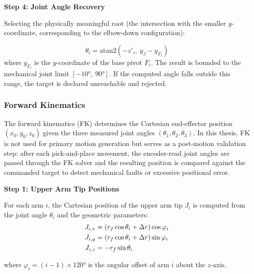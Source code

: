 \par\noindent\textbf{Step 4: Joint Angle Recovery}\par
\hspace{1.27cm}
Selecting the physically meaningful root (the intersection with the smaller $y$-coordinate,
corresponding to the elbow-down configuration):

\begin{equation}
    \theta_i = \text{atan2}\!\left(-z'_i,\ y_J - y_{F_i}\right)
    \label{eq:joint_angle}
\end{equation}
\hspace{1.27cm}
where $y_{F_i}$ is the $y$-coordinate of the base pivot $F_i$. The result is bounded to
the mechanical joint limit $[-10°,\ 90°]$. If the computed angle falls outside this range,
the target is declared unreachable and rejected.\par


\subsubsection{Forward Kinematics}
\hspace{1.27cm}
The forward kinematics (FK) determines the Cartesian end-effector position
$(x_0, y_0, z_0)$ given the three measured joint angles $(\theta_1, \theta_2, \theta_3)$.
In this thesis, FK is not used for primary motion generation but serves as a post-motion
validation step: after each pick-and-place movement, the encoder-read joint angles are
passed through the FK solver and the resulting position is compared against the commanded
target to detect mechanical faults or excessive positional error.

\par\noindent\textbf{Step 1: Upper Arm Tip Positions}\par
\hspace{1.27cm}
For each arm $i$, the Cartesian position of the upper arm tip $J_i$ is computed from
the joint angle $\theta_i$ and the geometric parameters:
\begin{align}
    J_{i,x} &= \left(r_f \cos\theta_i + \Delta r\right)\cos\varphi_i \notag \\
    J_{i,y} &= \left(r_f \cos\theta_i + \Delta r\right)\sin\varphi_i \notag \\
    J_{i,z} &= -r_f \sin\theta_i
    \label{eq:arm_tip}
\end{align}

where $\varphi_i = (i - 1) \times 120°$ is the angular offset of arm $i$ about the $z$-axis.

